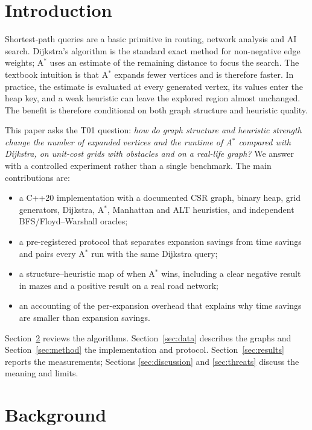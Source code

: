 \documentclass[conference,10pt]{IEEEtran}
\newcommand{\Astar}{A$^\ast$}
\begin{document}
\section{Introduction}
Shortest-path queries are a basic primitive in routing,
network analysis and AI search.  Dijkstra's algorithm \cite{dijkstra1959} is the
standard exact method for non-negative edge weights; \Astar{} \cite{hart1968}
uses an estimate of the remaining distance to focus the search.  The textbook
intuition is that \Astar{} expands fewer vertices and is therefore faster.  In
practice, the estimate is evaluated at every generated vertex, its values enter
the heap key, and a weak heuristic can leave the explored region almost
unchanged.  The benefit is therefore conditional on both graph structure and
heuristic quality.

This paper asks the T01 question: \emph{how do graph structure and heuristic
strength change the number of expanded vertices and the runtime of \Astar{}
compared with Dijkstra, on unit-cost grids with obstacles and on a real-life
graph?}  We answer with a controlled experiment rather than a single benchmark.
The main contributions are:
\begin{itemize}
  \item a C++20 implementation with a documented CSR graph, binary heap,
        grid generators, Dijkstra, \Astar{}, Manhattan and ALT heuristics, and
        independent BFS/Floyd--Warshall oracles;
  \item a pre-registered protocol that separates expansion savings from time
        savings and pairs every \Astar{} run with the same Dijkstra query;
  \item a structure--heuristic map of when \Astar{} wins, including a clear
        negative result in mazes and a positive result on a real road network;
  \item an accounting of the per-expansion overhead that explains why time
        savings are smaller than expansion savings.
\end{itemize}

Section~\ref{sec:background} reviews the algorithms.  Section~\ref{sec:data}
describes the graphs and Section~\ref{sec:method} the implementation and
protocol.  Section~\ref{sec:results} reports the measurements; Sections
\ref{sec:discussion} and \ref{sec:threats} discuss the meaning and limits.

\section{Background}
\label{sec:background}
\end{document}
